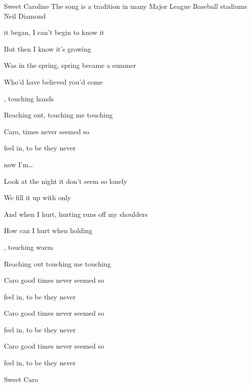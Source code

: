 \begin{SBSong}{Sweet Caroline}
  {The song is a tradition in many Major League Baseball stadiums}
  {Neil Diamond}
  \begin{SBVerse}
     it began, I can't begin to know it

    But then I know it's growing 

    Was in the spring,  spring became a summer

    Who'd have believed you'd come 
    
    , touching hands

    Reaching out, touching me touching 
  \end{SBVerse}
  \begin{SBChorus}
     Caro,  times never seemed so 

     feel in, to be they never 

     now I'm\ldots
  \end{SBChorus}
  \begin{SBVerse}
    Look at the night  it don't seem so lonely

    We fill it up with only 

    And when I hurt, hurting runs off my shoulders	

    How can I hurt when holding 

    , touching warm

    Reaching out touching me touching 
  \end{SBVerse}
  \begin{SBChorus}
     Caro good times never seemed so 

     feel in, to be they never 

        
  \end{SBChorus}
  \begin{SBChorus}
     Caro good times never seemed so 

     feel in, to be they never 
    
     Caro good times never seemed so 

     feel in, to be they never 
    
    Sweet Caro
  \end{SBChorus}
\end{SBSong}
